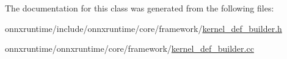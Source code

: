 The documentation for this class was generated from the following files\+:\begin{DoxyCompactItemize}
\item 
onnxruntime/include/onnxruntime/core/framework/\mbox{\hyperlink{kernel__def__builder_8h}{kernel\+\_\+def\+\_\+builder.\+h}}\item 
onnxruntime/onnxruntime/core/framework/\mbox{\hyperlink{kernel__def__builder_8cc}{kernel\+\_\+def\+\_\+builder.\+cc}}\end{DoxyCompactItemize}
